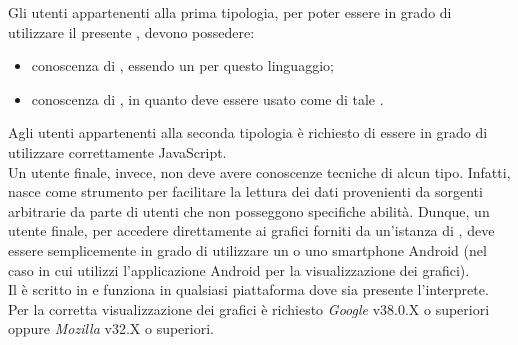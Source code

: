 		Gli utenti appartenenti alla prima tipologia, per poter essere in grado di utilizzare il presente , devono possedere:
		\begin{itemize}
			\item conoscenza di , essendo  un  per questo linguaggio;
			\item conoscenza di , in quanto  deve essere usato come  di tale .
		\end{itemize}
		Agli utenti appartenenti alla seconda tipologia è richiesto di essere in grado di utilizzare correttamente JavaScript.\\
		Un utente finale, invece, non deve avere conoscenze tecniche di alcun tipo. Infatti,  nasce come strumento per facilitare la lettura dei dati provenienti da sorgenti arbitrarie da parte di utenti che non posseggono specifiche abilità. Dunque, un utente finale, per accedere direttamente ai grafici forniti da un'istanza di , deve essere semplicemente in grado di utilizzare un  o uno smartphone Android (nel caso in cui utilizzi l'applicazione Android per la visualizzazione dei grafici).\\
		Il  è scritto in  e funziona in qualsiasi piattaforma dove sia presente l'interprete.
		Per la corretta visualizzazione dei grafici è richiesto \emph{Google } v38.0.X o superiori oppure \emph{Mozilla } v32.X o superiori.
